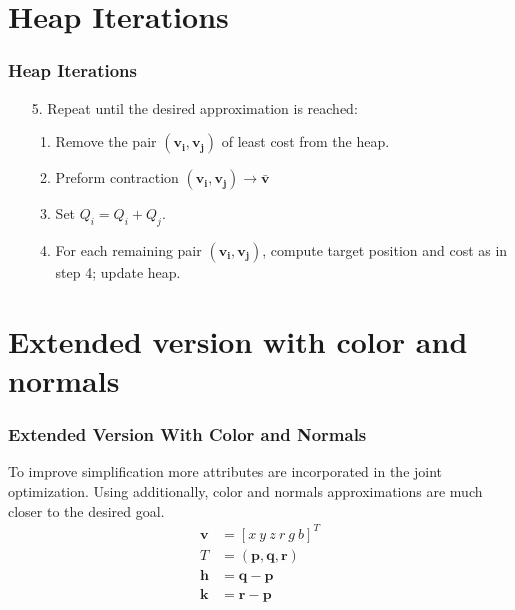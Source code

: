 \documentclass[
	10pt,
	t		%
]{beamer}
\begin{document}
\section{Heap Iterations}
\begin{frame}
\frametitle{Heap Iterations}
\centering
\begin{enumerate}
\item [5.] Repeat until the desired approximation is reached:
\begin{enumerate}
\item Remove the pair $(\mathbf{v_i}, \mathbf{v_j})$ of least cost from the heap.
\item Preform contraction $(\mathbf{v_i}, \mathbf{v_j})\rightarrow\bar{\mathbf{v}}$
\item Set $Q_i = Q_i + Q_j$.
\item For each remaining pair $(\mathbf{v_i}, \mathbf{v_j})$, compute target position and cost as in step 4; update heap.
\end{enumerate}
\end{enumerate}
\end{frame}

\section{Extended version with color and normals}
\begin{frame}
\frametitle{Extended Version With Color and Normals}
\centering
\begin{center}
To improve simplification more attributes are incorporated in the joint optimization. Using additionally, color and normals approximations are much closer to the desired goal.
\begin{align}
\mathbf{v} &= [x \ y \ z \ r \ g \ b]^T\\
T &= (\mathbf{p}, \mathbf{q}, \mathbf{r})\\ 
\mathbf{h} &= \mathbf{q} - \mathbf{p}\\
\mathbf{k} &= \mathbf{r} - \mathbf{p}
\end{align}
\end{center}
\end{frame}
\end{document}
